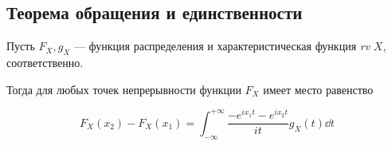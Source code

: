 \subsection{Теорема обращения и
единственности}\label{ux442ux435ux43eux440ux435ux43cux430-ux43eux431ux440ux430ux449ux435ux43dux438ux44f-ux438-ux435ux434ux438ux43dux441ux442ux432ux435ux43dux43dux43eux441ux442ux438}

Пусть \(F_X, g_X\) --- функция распределения и характеристическая
функция \emph{rv} \(X\), соответственно.

Тогда для любых точек непрерывности функции \(F_X\) имеет место
равенство

\[F_X(x_2) - F_X(x_1) = \int_{-\infty}^{+\infty} \frac{ -e^{ix_1t} - e^{ix_2t}}{it} g_X(t) \dd t\]
